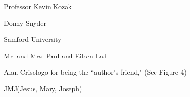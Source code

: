 \documentclass[10pt]{article}
\begin{document}
\vspace{2mm}\noindent\hspace{\parindent}Professor Kevin Kozak

\vspace{2mm}\noindent\hspace{\parindent}Donny Snyder

\vspace{2mm}\noindent\hspace{\parindent}Samford University

\vspace{2mm}\noindent\hspace{\parindent}Mr. and Mrs. Paul and Eileen Lad

\vspace{2mm}\noindent\hspace{\parindent}Alan Crisologo for being the \textquotedblleft author's friend," (See Figure 4)

\vspace{2mm}\noindent\hspace{\parindent}\Cross\hspace{1mm}JMJ\hspace{1mm}\Cross\hspace{2mm}(Jesus, Mary, Joseph)



\end{document}
